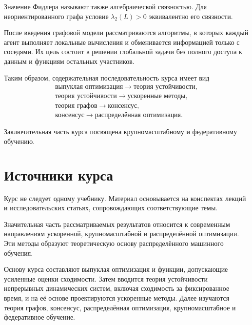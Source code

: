 Значение Фидлера называют также алгебраической связностью. Для
неориентированного графа условие \(\lambda_2(L)>0\) эквивалентно его
связности.

После введения графовой модели рассматриваются алгоритмы, в которых
каждый агент выполняет локальные вычисления и обменивается информацией
только с соседями. Их цель состоит в решении глобальной задачи без
полного доступа к данным и функциям остальных участников.

Таким образом, содержательная последовательность курса имеет вид
\[
    \begin{gathered}
        \text{выпуклая оптимизация}
        \longrightarrow
        \text{теория устойчивости},
        \\
        \text{теория устойчивости}
        \longrightarrow
        \text{ускоренные методы},
        \\
        \text{теория графов}
        \longrightarrow
        \text{консенсус},
        \\
        \text{консенсус}
        \longrightarrow
        \text{распределённая оптимизация}.
    \end{gathered}
\]

Заключительная часть курса посвящена крупномасштабному и
федеративному обучению.

\section{Источники курса}

Курс не следует одному учебнику. Материал основывается на конспектах
лекций и исследовательских статьях, сопровождающих соответствующие
темы.

Значительная часть рассматриваемых результатов относится к
современным направлениям ускоренной, крупномасштабной и
распределённой оптимизации. Эти методы образуют теоретическую основу
распределённого машинного обучения.


Основу курса составляют выпуклая оптимизация и функции, допускающие
усиленные оценки сходимости. Затем вводится теория устойчивости
непрерывных динамических систем, включая сходимость за фиксированное время, и на её основе проектируются ускоренные методы. Далее
изучаются теория графов, консенсус, распределённая оптимизация,
крупномасштабное и федеративное обучение.
